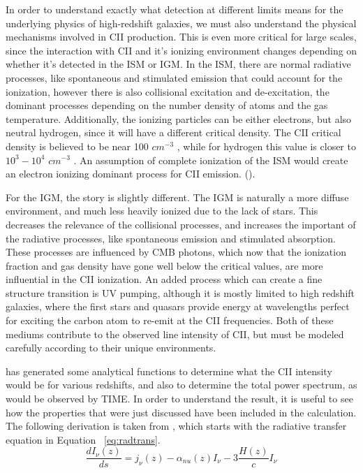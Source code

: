\documentclass[manuscript]{aastex}
\begin{document}
In order to understand exactly what detection at different limits means for the underlying physics of high-redshift galaxies, we must also understand the physical mechanisms involved in CII production. This is even more critical for large scales, since the interaction with CII and it's ionizing environment changes depending on whether it's detected in the ISM or IGM. In the ISM, there are normal radiative processes, like spontaneous and stimulated emission that could account for the ionization, however there is also collisional excitation and de-excitation, the dominant processes depending on the number density of atoms and the gas temperature. Additionally, the ionizing particles can be either electrons, but also neutral hydrogen, since it will have a different critical density. The CII critical density is believed to be near 100 $cm ^{-3}$ , while for hydrogen this value is closer to $10^{3} - 10^{4}$  $cm^{-3}$ .  An assumption of complete ionization of the ISM would create an electron ionizing dominant process for CII emission. (\cite{Gong2012}). 

For the IGM, the story is slightly different. The IGM is naturally a more diffuse environment, and much less heavily ionized due to the lack of stars. This decreases the relevance of the collisional processes, and increases the important of the radiative processes, like spontaneous emission and stimulated absorption. These processes are influenced by CMB photons, which now that the ionization fraction and gas density have gone well below the critical values, are more influential in the CII ionization. An added process which can create a fine structure transition is UV pumping, although it is mostly limited to high redshift galaxies, where the first stars and quasars provide energy at wavelengths perfect for exciting the carbon atom to re-emit at the CII frequencies. Both of these mediums contribute to the observed line intensity of CII, but must be modeled carefully according to their unique environments. 

\cite{Gong2012} has generated some analytical functions to determine what the CII intensity would be for various redshifts, and also to determine the total power spectrum, as would be observed by TIME. In order to understand the result, it is useful to see how the properties that were just discussed have been included in the calculation. The following derivation is taken from \cite{Gong2012}, which starts with the radiative transfer equation in Equation ~\ref{eq:radtrans}.
\begin{equation}\label{eq:radtrans}
\frac{dI_{\nu}(z)}{ds} = j_{\nu}(z) - \alpha_{nu}(z)I_{\nu} - 3 \frac{H(z)}{c}I_{\nu}
\end{equation}
\end{document}
